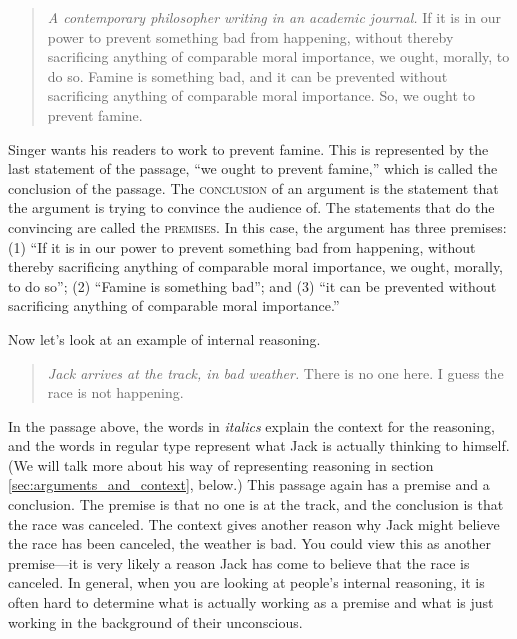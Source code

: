 \begin{quotation}\noindent \textit{A contemporary philosopher writing in an academic journal.} If it is in our power to prevent something bad from happening, without thereby sacrificing anything of comparable moral importance, we ought, morally, to do so. Famine is something bad, and it can be prevented without sacrificing anything of comparable moral importance. So, we ought to prevent famine. \citet{Singer1972}  \end{quotation}\label{singer_quote}

Singer wants his readers to work to prevent famine. This is represented by the last statement of the passage, ``we ought to prevent famine,'' which is called the conclusion of the passage. The \textsc{\gls{conclusion}} of an argument is the statement that the argument is trying to convince the audience of. The statements that do the convincing are called the \textsc{\glspl{premise}}. In this case, the argument has three premises: (1) ``If it is in our power to prevent something bad from happening, without thereby sacrificing anything of comparable moral importance, we ought, morally, to do so''; (2) ``Famine is something bad''; and (3) ``it can be prevented without sacrificing anything of comparable moral importance.''

Now let's look at an example of internal reasoning.

\begin{quotation}\noindent\textit{Jack arrives at the track, in bad weather.} There is no one here. I guess the race is not happening. \label{racetrack}
\end{quotation}

In the passage above, the words in \textit{italics} explain the context for the reasoning, and the words in regular type represent what Jack is actually thinking to himself. (We will talk more about his way of representing reasoning in section \ref{sec:arguments_and_context}, below.) This passage again has a premise and a conclusion. The premise is that no one is at the track, and the conclusion is that the race was canceled. The context gives another reason why Jack might believe the race has been canceled, the weather is bad. You could view this as another premise---it is very likely a reason Jack has come to believe that the race is canceled. In general, when you are looking at people's internal reasoning, it is often hard to determine what is actually working as a premise and what is just working in the background of their unconscious.


